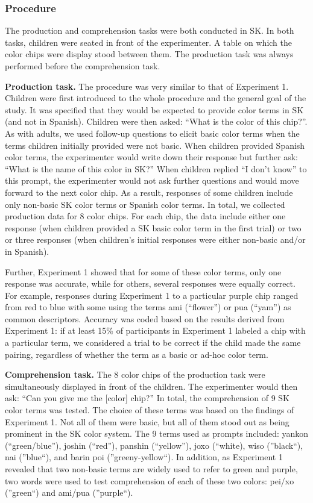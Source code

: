 \documentclass[,man,floatsintext]{apa6}
\theoremstyle{definition}
\theoremstyle{definition}
\theoremstyle{definition}
\theoremstyle{remark}
\begin{document}
\subsubsection{Procedure}\label{procedure-1}

The production and comprehension tasks were both conducted in SK. In
both tasks, children were seated in front of the experimenter. A table
on which the color chips were display stood between them. The production
task was always performed before the comprehension task.

\textbf{Production task.} The procedure was very similar to that of
Experiment 1. Children were first introduced to the whole procedure and
the general goal of the study. It was specified that they would be
expected to provide color terms in SK (and not in Spanish). Children
were then asked: \enquote{What is the color of this chip?}. As with
adults, we used follow-up questions to elicit basic color terms when the
terms children initially provided were not basic. When children provided
Spanish color terms, the experimenter would write down their response
but further ask: \enquote{What is the name of this color in SK?} When
children replied \enquote{I don't know} to this prompt, the experimenter
would not ask further questions and would move forward to the next color
chip. As a result, responses of some children include only non-basic SK
color terms or Spanish color terms. In total, we collected production
data for 8 color chips. For each chip, the data include either one
response (when children provided a SK basic color term in the first
trial) or two or three responses (when children's initial responses were
either non-basic and/or in Spanish).

Further, Experiment 1 showed that for some of these color terms, only
one response was accurate, while for others, several responses were
equally correct. For example, responses during Experiment 1 to a
particular purple chip ranged from red to blue with some using the terms
ami (\enquote{flower}) or pua (\enquote{yam}) as common descriptors.
Accuracy was coded based on the results derived from Experiment 1: if at
least 15\% of participants in Experiment 1 labeled a chip with a
particular term, we considered a trial to be correct if the child made
the same pairing, regardless of whether the term as a basic or ad-hoc
color term.

\textbf{Comprehension task.} The 8 color chips of the production task
were simultaneously displayed in front of the children. The experimenter
would then ask: \enquote{Can you give me the {[}color{]} chip?} In
total, the comprehension of 9 SK color terms was tested. The choice of
these terms was based on the findings of Experiment 1. Not all of them
were basic, but all of them stood out as being prominent in the SK color
system. The 9 terms used as prompts included: yankon
(\enquote{green/blue}), joshin (\enquote{red}), panshin
(\enquote{yellow}), joxo (\enquote{white), wiso (}black\enquote{), nai
(}blue\enquote{), and barin poi (}greeny-yellow\enquote{). In addition,
as Experiment 1 revealed that two non-basic terms are widely used to
refer to green and purple, two words were used to test comprehension of
each of these two colors: pei/xo (}green\enquote{) and ami/pua
(}purple``).
\end{document}

